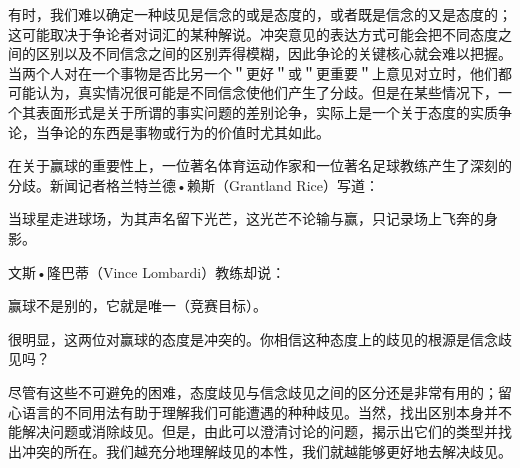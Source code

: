 有时，我们难以确定一种歧见是信念的或是态度的，或者既是信念的又是态度的；这可能取决于争论者对词汇的某种解说。冲突意见的表达方式可能会把不同态度之间的区别以及不同信念之间的区别弄得模糊，因此争论的关键核心就会难以把握。当两个人对在一个事物是否比另一个＂更好＂或＂更重要＂上意见对立时，他们都可能认为，真实情况很可能是不同信念使他们产生了分歧。但是在某些情况下，一个其表面形式是关于所谓的事实问题的差别论争，实际上是一个关于态度的实质争论，当争论的东西是事物或行为的价值时尤其如此。

在关于赢球的重要性上，一位著名体育运动作家和一位著名足球教练产生了深刻的分歧。新闻记者格兰特兰德•赖斯（Grantland Rice）写道：

\begin{displayquote}
当球星走进球场，为其声名留下光芒，这光芒不论输与赢，只记录场上飞奔的身影。
\end{displayquote}

文斯•隆巴蒂（Vince Lombardi）教练却说：

\begin{displayquote}
赢球不是别的，它就是唯一（竞赛目标）。
\end{displayquote}

很明显，这两位对赢球的态度是冲突的。你相信这种态度上的歧见的根源是信念歧见吗？

尽管有这些不可避免的困难，态度歧见与信念歧见之间的区分还是非常有用的；留心语言的不同用法有助于理解我们可能遭遇的种种歧见。当然，找出区别本身并不能解决问题或消除歧见。但是，由此可以澄清讨论的问题，揭示出它们的类型并找出冲突的所在。我们越充分地理解歧见的本性，我们就越能够更好地去解决歧见。

\begin{center}
\end{center} 